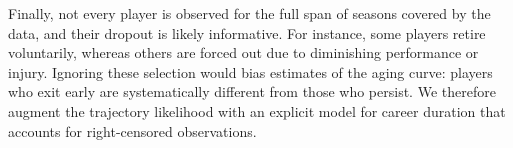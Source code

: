 \documentclass[aoas]{imsart}
\begin{document}




 

%
%

Finally, not every player is observed for the full span of seasons covered by the data, and their dropout is likely informative.  For instance, some players retire voluntarily, whereas others are forced out due to diminishing performance or injury.  Ignoring these selection would bias estimates of the aging curve: players who exit early are systematically different from those who persist.  We therefore augment the trajectory likelihood with an explicit model for career duration that accounts for right-censored observations.
\end{document}
